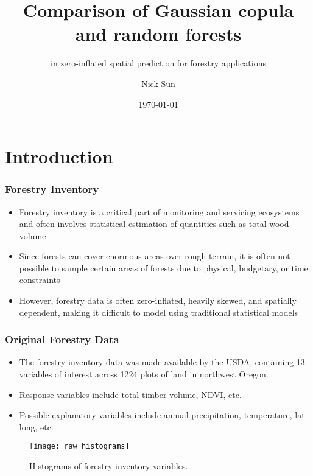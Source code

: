 \documentclass{beamer}
\title{Comparison of Gaussian copula and random forests}
\subtitle{in zero-inflated spatial prediction for forestry applications}
\author{Nick Sun}
\institute{Oregon State University, Department of Statistics}
\date{\today}
\begin{document}
\begin{frame}
\titlepage
\end{frame}


\section{Introduction}
\begin{frame}
\frametitle{Forestry Inventory}
\begin{itemize}
	\item Forestry inventory is a critical part of monitoring and servicing ecosystems and often involves statistical estimation of quantities such as total wood volume
	\item Since forests can cover enormous areas over rough terrain, it is often not possible to sample certain areas of forests due to physical, budgetary, or time constraints
	\item However, forestry data is often zero-inflated, heavily skewed, and spatially dependent, making it difficult to model using traditional statistical models
\end{itemize}
\end{frame}

\begin{frame}
	\frametitle{Original Forestry Data}
	\begin{itemize}
		\item The forestry inventory data was made available by the USDA, containing 13 variables of interest across 1224 plots of land in northwest Oregon.
		\item Response variables include total timber volume, NDVI, etc.
		\item Possible explanatory variables include annual precipitation, temperature, lat-long, etc.
	\end{itemize}
	\begin{center}
		\begin{figure}
		\texttt{[image: raw\_histograms]}
		\caption{Histograms of forestry inventory variables.}
		\end{figure}
	\end{center}
\end{frame}
\end{document}
